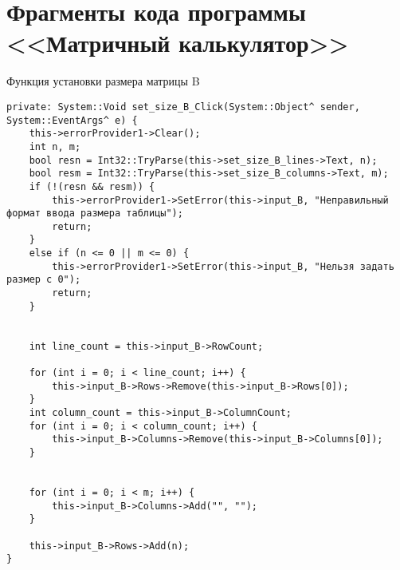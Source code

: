 \section{Фрагменты кода программы <<Матричный калькулятор>>}
\label{app:matrix}

Функция установки размера матрицы B
\begin{verbatim}
private: System::Void set_size_B_Click(System::Object^ sender, System::EventArgs^ e) {
	this->errorProvider1->Clear();
	int n, m;
	bool resn = Int32::TryParse(this->set_size_B_lines->Text, n);
	bool resm = Int32::TryParse(this->set_size_B_columns->Text, m);
	if (!(resn && resm)) {
		this->errorProvider1->SetError(this->input_B, "Неправильный формат ввода размера таблицы");
		return;
	}
	else if (n <= 0 || m <= 0) {
		this->errorProvider1->SetError(this->input_B, "Нельзя задать размер с 0");
		return;
	}


	int line_count = this->input_B->RowCount;

	for (int i = 0; i < line_count; i++) {
		this->input_B->Rows->Remove(this->input_B->Rows[0]);
	}
	int column_count = this->input_B->ColumnCount;
	for (int i = 0; i < column_count; i++) {
		this->input_B->Columns->Remove(this->input_B->Columns[0]);
	}


	for (int i = 0; i < m; i++) {
		this->input_B->Columns->Add("", "");
	}

	this->input_B->Rows->Add(n);
}
\end{verbatim}
